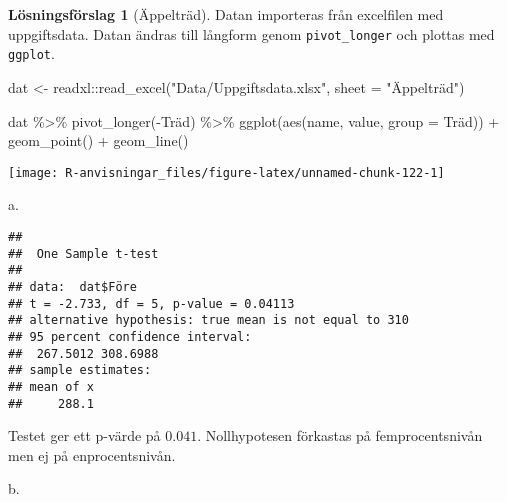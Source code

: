 \documentclass[
]{book}
\newenvironment{Shaded}{\begin{snugshade}}{\end{snugshade}}
\newcommand{\AttributeTok}[1]{\textcolor[rgb]{0.77,0.63,0.00}{#1}}
\newcommand{\DecValTok}[1]{\textcolor[rgb]{0.00,0.00,0.81}{#1}}
\newcommand{\FunctionTok}[1]{\textcolor[rgb]{0.00,0.00,0.00}{#1}}
\newcommand{\NormalTok}[1]{#1}
\newcommand{\OtherTok}[1]{\textcolor[rgb]{0.56,0.35,0.01}{#1}}
\newcommand{\SpecialCharTok}[1]{\textcolor[rgb]{0.00,0.00,0.00}{#1}}
\newcommand{\StringTok}[1]{\textcolor[rgb]{0.31,0.60,0.02}{#1}}
\theoremstyle{definition}
\theoremstyle{definition}
\theoremstyle{definition}
\theoremstyle{definition}
\newtheorem{hypothesis}{Lösningsförslag}[chapter]
\theoremstyle{remark}
\begin{document}
\begin{hypothesis}[Äppelträd]
Datan importeras från excelfilen med uppgiftsdata. Datan ändras till långform genom \texttt{pivot\_longer} och plottas med \texttt{ggplot}.

\begin{Shaded}
\begin{Highlighting}[]
\NormalTok{dat }\OtherTok{\textless{}{-}}\NormalTok{ readxl}\SpecialCharTok{::}\FunctionTok{read\_excel}\NormalTok{(}\StringTok{"Data/Uppgiftsdata.xlsx"}\NormalTok{, }\AttributeTok{sheet =} \StringTok{"Äppelträd"}\NormalTok{)}

\NormalTok{dat }\SpecialCharTok{\%\textgreater{}\%} 
  \FunctionTok{pivot\_longer}\NormalTok{(}\SpecialCharTok{{-}}\NormalTok{Träd) }\SpecialCharTok{\%\textgreater{}\%} 
  \FunctionTok{ggplot}\NormalTok{(}\FunctionTok{aes}\NormalTok{(name, value, }\AttributeTok{group =}\NormalTok{ Träd)) }\SpecialCharTok{+}
  \FunctionTok{geom\_point}\NormalTok{() }\SpecialCharTok{+}
  \FunctionTok{geom\_line}\NormalTok{()}
\end{Highlighting}
\end{Shaded}

\begin{center}\texttt{[image: R-anvisningar\_files/figure-latex/unnamed-chunk-122-1]} \end{center}

a.

\begin{Shaded}
\end{Shaded}

\begin{verbatim}
## 
##  One Sample t-test
## 
## data:  dat$Före
## t = -2.733, df = 5, p-value = 0.04113
## alternative hypothesis: true mean is not equal to 310
## 95 percent confidence interval:
##  267.5012 308.6988
## sample estimates:
## mean of x 
##     288.1
\end{verbatim}

Testet ger ett p-värde på \(0.041\). Nollhypotesen förkastas på femprocentsnivån men ej på enprocentsnivån.

b.

\begin{Shaded}
\end{Shaded}


\end{hypothesis}
\end{document}
